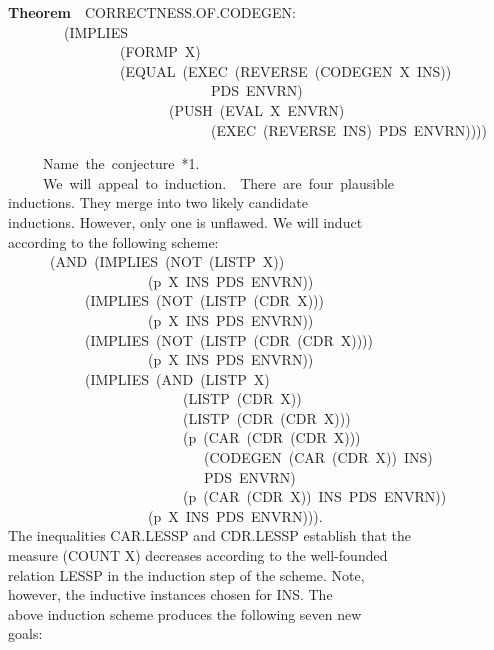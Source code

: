 \documentclass[10pt]{book}
\newenvironment{pubasis}{\begin{flushleft}}{\end{flushleft}}
\newcommand{\axiomordefinition}[1]{\vspace{6pt}\Large\textsf{\textbf{#1}}\normalsize}
\begin{document}
\begin{pubasis}
\axiomordefinition{Theorem}~~CORRECTNESS.OF.CODEGEN:\\
~~~~~~~~(IMPLIES\\
~~~~~~~~~~~~~~~~(FORMP~X)\\
~~~~~~~~~~~~~~~~(EQUAL~(EXEC~(REVERSE~(CODEGEN~X~INS))\\
~~~~~~~~~~~~~~~~~~~~~~~~~~~~~PDS~ENVRN)\\
~~~~~~~~~~~~~~~~~~~~~~~(PUSH~(EVAL~X~ENVRN)\\
~~~~~~~~~~~~~~~~~~~~~~~~~~~~~(EXEC~(REVERSE~INS)~PDS~ENVRN))))\\
\end{pubasis}
\begin{pubasis}
~~~~~Name~the~conjecture~*1.\\

~~~~~We~will~appeal~to~induction.~~There~are~four~plausible\\
inductions.  They merge into two likely candidate\\
inductions.  However, only one is unflawed.  We will induct\\
according to the following scheme:\\
~~~~~~(AND~(IMPLIES~(NOT~(LISTP~X))\\
~~~~~~~~~~~~~~~~~~~~(p~X~INS~PDS~ENVRN))\\
~~~~~~~~~~~(IMPLIES~(NOT~(LISTP~(CDR~X)))\\
~~~~~~~~~~~~~~~~~~~~(p~X~INS~PDS~ENVRN))\\
~~~~~~~~~~~(IMPLIES~(NOT~(LISTP~(CDR~(CDR~X))))\\
~~~~~~~~~~~~~~~~~~~~(p~X~INS~PDS~ENVRN))\\
~~~~~~~~~~~(IMPLIES~(AND~(LISTP~X)\\
~~~~~~~~~~~~~~~~~~~~~~~~~(LISTP~(CDR~X))\\
~~~~~~~~~~~~~~~~~~~~~~~~~(LISTP~(CDR~(CDR~X)))\\
~~~~~~~~~~~~~~~~~~~~~~~~~(p~(CAR~(CDR~(CDR~X)))\\
~~~~~~~~~~~~~~~~~~~~~~~~~~~~(CODEGEN~(CAR~(CDR~X))~INS)\\
~~~~~~~~~~~~~~~~~~~~~~~~~~~~PDS~ENVRN)\\
~~~~~~~~~~~~~~~~~~~~~~~~~(p~(CAR~(CDR~X))~INS~PDS~ENVRN))\\
~~~~~~~~~~~~~~~~~~~~(p~X~INS~PDS~ENVRN))).\\
The inequalities CAR.LESSP and CDR.LESSP establish that the\\
measure (COUNT X) decreases according to the well-founded\\
relation LESSP in the induction step of the scheme.  Note,\\
however, the inductive instances chosen for INS.  The\\
above induction scheme produces the following seven new\\
goals:\\


\end{pubasis}
\end{document}
